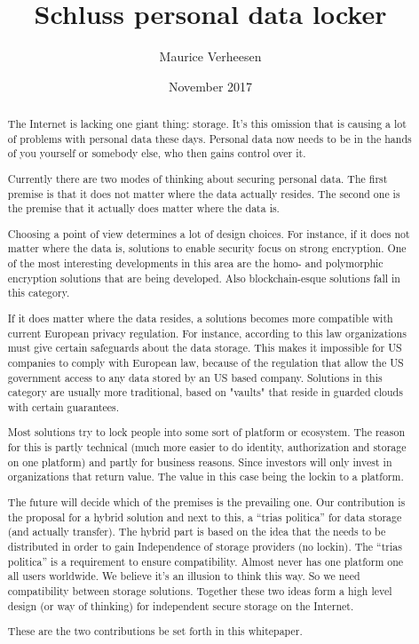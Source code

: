 \documentclass{article}
\title{Schluss personal data locker}
\author{Maurice Verheesen}
\date{November 2017}
\begin{document}
\maketitle
\begin{abstract}
The Internet is lacking one giant thing: storage. It's this omission that is causing
a lot of problems with personal data these days. Personal data now needs to be in the hands of you yourself or somebody else, who then gains control over it.

Currently there are two modes of thinking about securing personal data. The first
premise is that it does not matter where the data actually resides. The second one
is the premise that it actually does matter where the data is.

Choosing a point of view determines a lot of design choices. For instance, if it
does not matter where the data is, solutions to enable security focus on strong
encryption. One of the most interesting developments in this area are the homo- and
polymorphic encryption solutions that are being developed. Also blockchain-esque solutions fall in this category.

If it does matter where the data resides, a solutions becomes more compatible with
current European privacy regulation. For instance, according to this law organizations must give certain safeguards about the data storage. This makes it impossible for US companies to comply with European law, because of the regulation that allow the US government access to any data stored by an US based company. Solutions in this category are usually more traditional, based on "vaults" that reside in guarded clouds with
certain guarantees.

Most solutions try to lock people into some sort of platform or ecosystem. The reason for this is partly technical (much more easier to do identity, authorization and storage on one platform) and partly for business reasons. Since investors will only invest in organizations that return value. The value in this case being the lockin to a
platform.

The future will decide which of the premises is the prevailing one. Our contribution
is the proposal for a hybrid solution and next to this, a ``trias politica'' for data
storage (and actually transfer). The hybrid part is based on the idea that the needs
to be distributed in order to gain Independence of storage providers (no lockin). The ``trias politica'' is a requirement to ensure compatibility. Almost never has one platform one all users worldwide. We believe it's an illusion to think this way. So we
need compatibility between storage solutions. Together these two ideas form a high level design (or way of thinking) for independent secure storage on the Internet.

These are the two contributions be set forth in this whitepaper.
\end{abstract}
\end{document}
